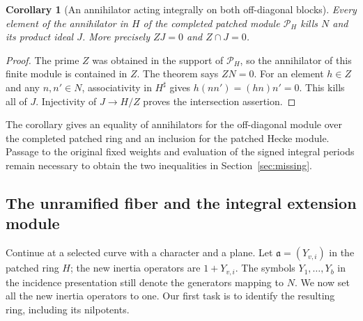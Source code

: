 \documentclass[a4paper,11pt]{article}
\newtheorem{corollary}[proposition]{Corollary}
\theoremstyle{definition}
\theoremstyle{remark}
\numberwithin{equation}{section}
\begin{document}
\begin{corollary}[An annihilator acting integrally on both off-diagonal blocks]\leavevmode
\label{cor:unpowered413}
Every element of the annihilator in \(H\) of the completed
patched module \(\mathcal P_H\) kills \(N\) and its product
ideal \(J\). More precisely \(ZJ=0\) and \(Z\cap J=0\).
\end{corollary}
\begin{proof}
The prime \(Z\) was obtained in the support of
\(\mathcal P_H\), so the annihilator of this finite module
is contained in \(Z\). The theorem says \(ZN=0\). For an
element \(h\in Z\) and any \(n,n'\in N\), associativity in
\(H^\sharp\) gives \(h(nn')=(hn)n'=0\). This kills all of
\(J\). Injectivity of \(J\to H/Z\) proves the intersection
assertion.
\end{proof}

The corollary gives an equality of annihilators for the
off-diagonal module over the completed patched ring and
an inclusion for the patched Hecke module. Passage to
the original fixed weights and evaluation of the signed
integral periods remain necessary to obtain the two
inequalities in Section~\ref{sec:missing}.


\subsection{The unramified fiber and the integral extension module}
\label{sec:unramifiedcorner414}

Continue at a selected curve with a character and a plane.
Let \(\mathfrak a=(Y_{v,i})\) in the patched ring \(H\);
the new inertia operators are \(1+Y_{v,i}\). The symbols
\(Y_1,\ldots,Y_b\) in the incidence presentation still
denote the generators mapping to \(N\). We now set all
the new inertia operators to one. Our first task is to
identify the resulting ring, including its nilpotents.
\end{document}
